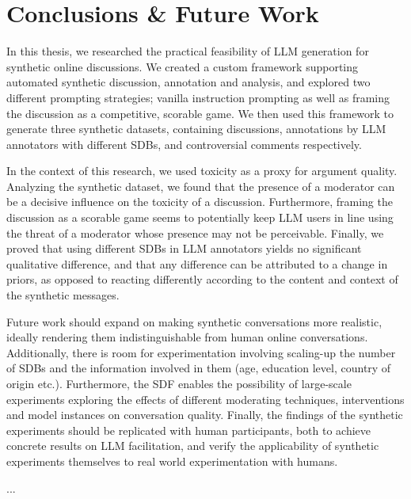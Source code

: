 %
\chapter{Conclusions \& Future Work}
\label{sec:conclusions}

In this thesis, we researched the practical feasibility of LLM generation for synthetic online discussions. We created a custom framework supporting automated synthetic discussion, annotation and analysis, and explored two different prompting strategies; vanilla instruction prompting as well as framing the discussion as a competitive, scorable game. We then used this framework to generate three synthetic datasets, containing discussions, annotations by LLM annotators with different \acp{SDB}, and controversial comments respectively. 

In the context of this research, we used toxicity as a proxy for argument quality. Analyzing the synthetic dataset, we found that the presence of a moderator can be a decisive influence on the toxicity of a discussion. Furthermore, framing the discussion as a scorable game seems to potentially keep LLM users in line using the threat of a moderator whose presence may not be perceivable. Finally, we proved that using different \acp{SDB} in LLM annotators yields no significant qualitative difference, and that any difference can be attributed to a change in priors, as opposed to reacting differently according to the content and context of the synthetic messages.

Future work should expand on making synthetic conversations more realistic, ideally rendering them indistinguishable from human online conversations. Additionally, there is room for experimentation involving scaling-up the number of \acp{SDB} and the information involved in them (age, education level, country of origin etc.). Furthermore, the \ac{SDF} enables the possibility of large-scale experiments exploring the effects of different moderating techniques, interventions and model instances on conversation quality. Finally, the findings of the synthetic experiments should be replicated with human participants, both to achieve concrete results on LLM facilitation, and verify the applicability of synthetic experiments themselves to real world experimentation with humans.

...
